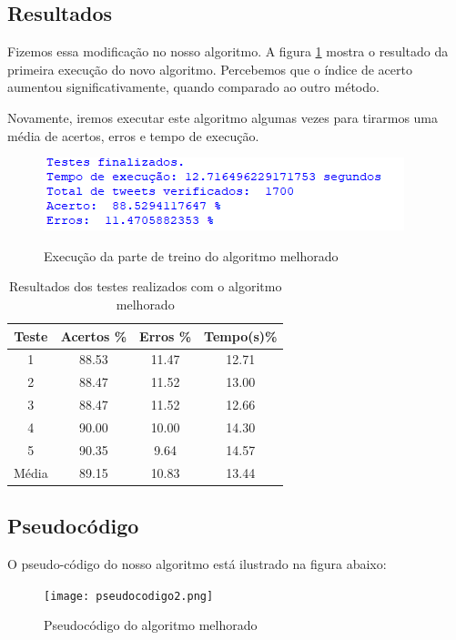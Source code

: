 \documentclass[
article,			%
12pt,				%
a4paper,			%
english,			%
brazil,				%
sumario=tradicional,
twoside
]{abntex2}
\begin{document}
	\subsection{Resultados}
	Fizemos essa modificação no nosso algoritmo. A figura \ref{fig: melhoria1} mostra o resultado da primeira execução do novo algoritmo. Percebemos que o índice de acerto aumentou significativamente, quando comparado ao outro método.
	
	Novamente, iremos executar este algoritmo algumas vezes para tirarmos uma média de acertos, erros e tempo de execução.
	
	\begin{figure}[h!]
		\centering
		\caption{Execução da parte de treino do algoritmo melhorado}
		\includegraphics[scale=1]{melhoria1.png}
		\label{fig: melhoria1}
	\end{figure}


	\begin{table}[!h]
		\caption{Resultados dos testes realizados com o algoritmo melhorado}
		\label{tab: testes2}
		\centering
		
		\begin{tabular}{|c|c|c|c|} \hline
			\textbf{Teste} & \textbf{Acertos \%} & \textbf{Erros \%} & \textbf{Tempo(s)\%} \\
			\hline
			1 & 88.53 & 11.47 & 12.71\\
			2 & 88.47 & 11.52 & 13.00\\
			3 & 88.47 & 11.52 & 12.66 \\
			4 & 90.00 & 10.00 & 14.30 \\
			5 & 90.35 & 9.64 & 14.57 \\
			
			\hline
			Média & 89.15 & 10.83 & 13.44\\
			\hline
			
		\end{tabular}
		
	\end{table}
	
	\subsection{Pseudocódigo}
	O pseudo-código do nosso algoritmo está ilustrado na figura abaixo:
	\begin{figure}[h!]
		\centering
		\caption{Pseudocódigo do algoritmo melhorado}
		\texttt{[image: pseudocodigo2.png]}
		\label{fig: pseudocodigo2}
	\end{figure}
	
\end{document}
